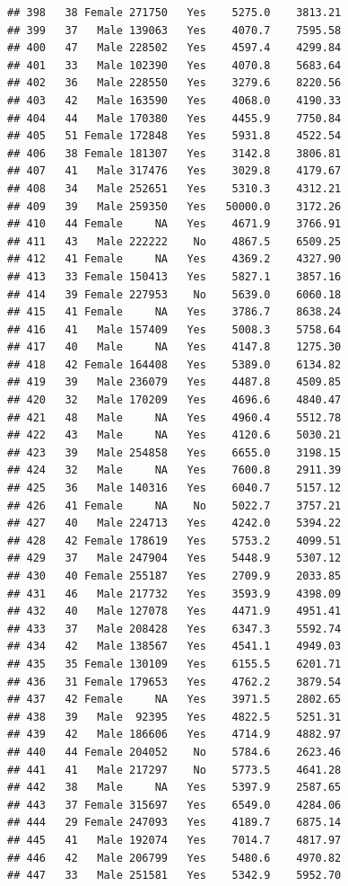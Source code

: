 \documentclass[12pt,]{krantz}
\theoremstyle{definition}
\theoremstyle{definition}
\theoremstyle{remark}
\begin{document}
\begin{verbatim}
## 398   38 Female 271750   Yes    5275.0    3813.21
## 399   37   Male 139063   Yes    4070.7    7595.58
## 400   47   Male 228502   Yes    4597.4    4299.84
## 401   33   Male 102390   Yes    4070.8    5683.64
## 402   36   Male 228550   Yes    3279.6    8220.56
## 403   42   Male 163590   Yes    4068.0    4190.33
## 404   44   Male 170380   Yes    4455.9    7750.84
## 405   51 Female 172848   Yes    5931.8    4522.54
## 406   38 Female 181307   Yes    3142.8    3806.81
## 407   41   Male 317476   Yes    3029.8    4179.67
## 408   34   Male 252651   Yes    5310.3    4312.21
## 409   39   Male 259350   Yes   50000.0    3172.26
## 410   44 Female     NA   Yes    4671.9    3766.91
## 411   43   Male 222222    No    4867.5    6509.25
## 412   41 Female     NA   Yes    4369.2    4327.90
## 413   33 Female 150413   Yes    5827.1    3857.16
## 414   39 Female 227953    No    5639.0    6060.18
## 415   41 Female     NA   Yes    3786.7    8638.24
## 416   41   Male 157409   Yes    5008.3    5758.64
## 417   40   Male     NA   Yes    4147.8    1275.30
## 418   42 Female 164408   Yes    5389.0    6134.82
## 419   39   Male 236079   Yes    4487.8    4509.85
## 420   32   Male 170209   Yes    4696.6    4840.47
## 421   48   Male     NA   Yes    4960.4    5512.78
## 422   43   Male     NA   Yes    4120.6    5030.21
## 423   39   Male 254858   Yes    6655.0    3198.15
## 424   32   Male     NA   Yes    7600.8    2911.39
## 425   36   Male 140316   Yes    6040.7    5157.12
## 426   41 Female     NA    No    5022.7    3757.21
## 427   40   Male 224713   Yes    4242.0    5394.22
## 428   42 Female 178619   Yes    5753.2    4099.51
## 429   37   Male 247904   Yes    5448.9    5307.12
## 430   40 Female 255187   Yes    2709.9    2033.85
## 431   46   Male 217732   Yes    3593.9    4398.09
## 432   40   Male 127078   Yes    4471.9    4951.41
## 433   37   Male 208428   Yes    6347.3    5592.74
## 434   42   Male 138567   Yes    4541.1    4949.03
## 435   35 Female 130109   Yes    6155.5    6201.71
## 436   31 Female 179653   Yes    4762.2    3879.54
## 437   42 Female     NA   Yes    3971.5    2802.65
## 438   39   Male  92395   Yes    4822.5    5251.31
## 439   42   Male 186606   Yes    4714.9    4882.97
## 440   44 Female 204052    No    5784.6    2623.46
## 441   41   Male 217297    No    5773.5    4641.28
## 442   38   Male     NA   Yes    5397.9    2587.65
## 443   37 Female 315697   Yes    6549.0    4284.06
## 444   29 Female 247093   Yes    4189.7    6875.14
## 445   41   Male 192074   Yes    7014.7    4817.97
## 446   42   Male 206799   Yes    5480.6    4970.82
## 447   33   Male 251581   Yes    5342.9    5952.70

\end{verbatim}
\end{document}
